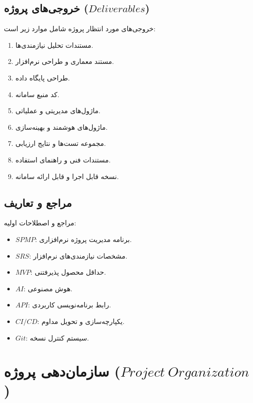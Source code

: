 \documentclass[12pt,a4paper]{article}
\begin{document}
	\subsection{خروجی‌های پروژه ($Deliverables$)}
	
	خروجی‌های مورد انتظار پروژه شامل موارد زیر است:
	
	\begin{enumerate}
		\item مستندات تحلیل نیازمندی‌ها.
		\item مستند معماری و طراحی نرم‌افزار.
		\item طراحی پایگاه داده.
		\item کد منبع سامانه.
		\item ماژول‌های مدیریتی و عملیاتی.
		\item ماژول‌های هوشمند و بهینه‌سازی.
		\item مجموعه تست‌ها و نتایج ارزیابی.
		\item مستندات فنی و راهنمای استفاده.
		\item نسخه قابل اجرا و قابل ارائه سامانه.
	\end{enumerate}
	
	\subsection{مراجع و تعاریف}
	
	مراجع و اصطلاحات اولیه:
	
	\begin{itemize}
		\item $SPMP$: برنامه مدیریت پروژه نرم‌افزاری.
		\item $SRS$: مشخصات نیازمندی‌های نرم‌افزار.
		\item $MVP$: حداقل محصول پذیرفتنی.
		\item $AI$: هوش مصنوعی.
		\item $API$: رابط برنامه‌نویسی کاربردی.
		\item $CI/CD$: یکپارچه‌سازی و تحویل مداوم.
		\item $Git$: سیستم کنترل نسخه.
	\end{itemize}
	
	
	\section{سازمان‌دهی پروژه ($Project\ Organization$)}
	
\end{document}

